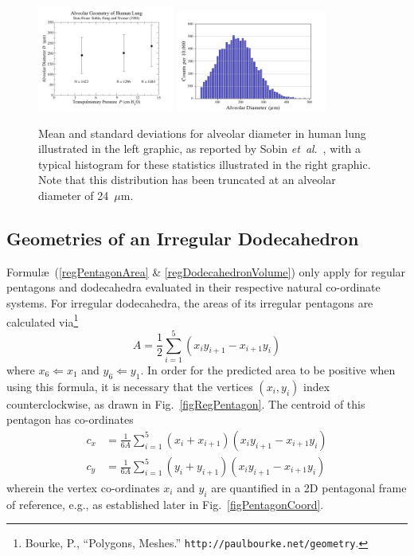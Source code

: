 \begin{figure}
	\centering
	\includegraphics[width=0.4\textwidth]{figures/septalLength.jpg}
    \includegraphics[width=0.44\textwidth]{figures/alveolarDiaHistogram.jpg}
	\caption{Mean and standard deviations for alveolar diameter in human lung illustrated in the left graphic, as reported by Sobin \textit{et~al}.\ \cite{Sobinetal88}, with a typical histogram for these statistics illustrated in the right graphic.  Note that this distribution has been truncated at an alveolar diameter of 24~$\mu$m.}
	\label{septalLengthFig}
\end{figure}

\subsection{Geometries of an Irregular Dodecahedron}
\label{sec:geometries}

Formul\ae\ (\ref{regPentagonArea} \& \ref{regDodecahedronVolume}) only apply for regular pentagons and dodecahedra evaluated in their respective natural co-ordinate systems.  For irregular dodecahedra, the areas of its irregular pentagons are calculated via\footnote{
	Bourke, P., ``Polygons, Meshes.'' \texttt{http://paulbourke.net/geometry}.
}
\begin{equation}
	A = \frac{1}{2} \sum_{i=1}^5 ( x_i y_{i+1} - x_{i+1} y_i)
	\label{irregularPentagonArea}
\end{equation}
where $x_6 \Leftarrow x_1$ and $y_6 \Leftarrow y_1$.  In order for the predicted area to be positive when using this formula, it is necessary that the vertices $(x_i , y_i)$ index counterclockwise, as drawn in Fig.~\ref{figRegPentagon}.  The centroid of this pentagon has co-ordinates\footnotemark[\value{footnote}]
\begin{subequations}
	\label{centroidPentagon}
	\begin{align}
		c_x & = \frac{1}{6 A} \sum_{i=1}^5 (x_i + x_{i+1})
			( x_i y_{i+1} - x_{i+1} y_i) \\
		c_y & = \frac{1}{6 A} \sum_{i=1}^5 (y_i + y_{i+1})
		( x_i y_{i+1} - x_{i+1} y_i)
	\end{align}
\end{subequations}
wherein the vertex co-ordinates $x_i$ and $y_i$ are quantified in a 2D pentagonal frame of reference, e.g., as established later in Fig.~\ref{figPentagonCoord}.

